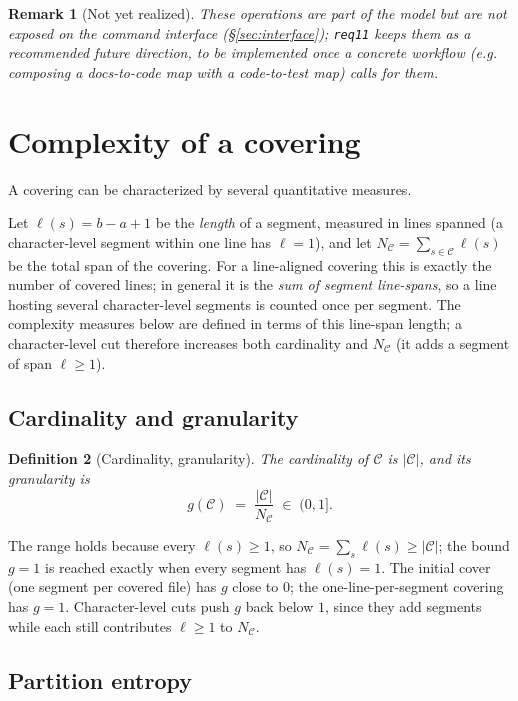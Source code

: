 \documentclass[11pt,a4paper]{article}
\newtheorem{definition}{Definition}[section]
\newtheorem{remark}[definition]{Remark}
\newcommand{\Cov}{\mathcal{C}}
\begin{document}
\begin{remark}[Not yet realized]
These operations are part of the model but are not exposed on the command
interface (\S\ref{sec:interface}); \texttt{req11} keeps them as a
recommended future direction, to be implemented once a concrete workflow
(e.g. composing a docs-to-code map with a code-to-test map) calls for
them.
\end{remark}

\section{Complexity of a covering}\label{sec:complexity}

A covering can be characterized by several quantitative measures.

Let $\ell(s) = b - a + 1$ be the \emph{length} of a segment, measured
in lines spanned (a character-level segment within one line has
$\ell = 1$), and let $N_\Cov = \sum_{s \in \Cov} \ell(s)$ be the total
span of the covering. For a line-aligned covering this is exactly the
number of covered lines; in general it is the \emph{sum of segment
line-spans}, so a line hosting several character-level segments is
counted once per segment. The complexity measures below are defined in
terms of this line-span length; a character-level cut therefore
increases both cardinality and $N_\Cov$ (it adds a segment of span
$\ell \ge 1$).

\subsection{Cardinality and granularity}

\begin{definition}[Cardinality, granularity]\label{def:size}
The \emph{cardinality} of $\Cov$ is $|\Cov|$, and its
\emph{granularity} is
\[
  g(\Cov) \;=\; \frac{|\Cov|}{N_\Cov} \;\in\; (0, 1].
\]
\end{definition}

The range holds because every $\ell(s) \ge 1$, so
$N_\Cov = \sum_s \ell(s) \ge |\Cov|$; the bound $g = 1$ is reached exactly
when every segment has $\ell(s) = 1$. The initial cover (one segment per
covered file) has $g$ close to $0$; the one-line-per-segment covering has
$g = 1$. Character-level cuts push $g$ back below $1$, since they add
segments while each still contributes $\ell \ge 1$ to $N_\Cov$.

\subsection{Partition entropy}
\end{document}
